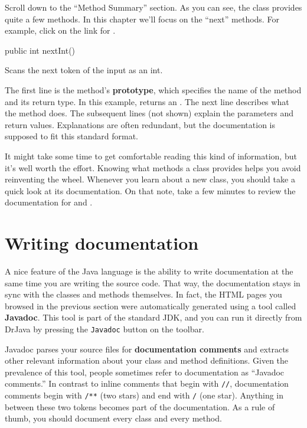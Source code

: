 Scroll down to the ``Method Summary'' section.
As you can see, the  class provides quite a few methods.
In this chapter we'll focus on the ``next'' methods.
For example, click on the link for .

\begin{stdout}
public int nextInt()

Scans the next token of the input as an int.
\end{stdout}


The first line is the method's {\bf prototype}, which specifies the name of the method and its return type.
In this example,  returns an .
The next line describes what the method does.
The subsequent lines (not shown) explain the parameters and return values.
Explanations are often redundant, but the documentation is supposed to fit this standard format.

It might take some time to get comfortable reading this kind of information, but it's well worth the effort.
Knowing what methods a class provides helps you avoid reinventing the wheel.
Whenever you learn about a new class, you should take a quick look at its documentation.
On that note, take a few minutes to review the documentation for  and .


\section{Writing documentation}


A nice feature of the Java language is the ability to write documentation at the same time you are writing the source code.
That way, the documentation stays in sync with the classes and methods themselves.
In fact, the HTML pages you browsed in the previous section were automatically generated using a tool called {\bf Javadoc}.
This tool is part of the standard JDK, and you can run it directly from DrJava by pressing the {\tt Javadoc} button on the toolbar.


Javadoc parses your source files for {\bf documentation comments} and extracts other relevant information about your class and method definitions.
Given the prevalence of this tool, people sometimes refer to documentation as ``Javadoc comments.''
In contrast to inline comments that begin with {\tt //}, documentation comments begin with {\tt /**} (two stars) and end with {\tt */} (one star).
Anything in between these two tokens becomes part of the documentation.
As a rule of thumb, you should document every class and every method.


